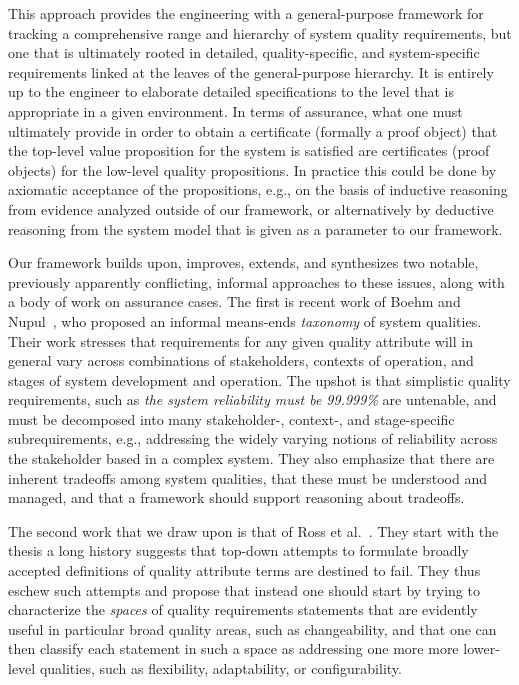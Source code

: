\documentclass[conference]{IEEEtran}
\begin{document}
This approach provides the engineering with a general-purpose framework for tracking a comprehensive range and hierarchy of system quality requirements, but one that is ultimately rooted in detailed, quality-specific, and system-specific requirements linked at the leaves of the general-purpose hierarchy. It is entirely up to the engineer to elaborate detailed specifications to the level that is appropriate in a given environment. In terms of assurance, what one must ultimately provide in order to obtain a certificate (formally a proof object) that the top-level value proposition for the system is satisfied are certificates (proof objects) for the low-level quality propositions. In practice this could be done by axiomatic acceptance of the propositions, e.g., on the basis of inductive reasoning from evidence analyzed outside of our framework, or alternatively by deductive reasoning from the system model that is given as a parameter to our framework.  

Our framework builds upon, improves, extends, and synthesizes two notable, previously apparently conflicting, informal approaches to these issues, along with a body of work on assurance cases. The first is recent work of Boehm and Nupul~\cite{}, who proposed an informal means-ends {\em taxonomy} of system qualities. Their work stresses that requirements for any given quality attribute will in general vary across combinations of stakeholders, contexts of operation, and stages of system development and operation. The upshot is that simplistic quality requirements, such as {\em the system reliability must be 99.999\%} are untenable, and must be decomposed into many stakeholder-, context-, and stage-specific subrequirements, e.g., addressing the widely varying notions of reliability across the stakeholder based in a complex system. They also emphasize that there are inherent tradeoffs among system qualities, that these must be understood and managed, and that a framework should support reasoning about tradeoffs. 

The second work that we draw upon is that of Ross et al.~\cite{ross-15}. They start with the thesis a long history suggests that top-down attempts to formulate broadly accepted definitions of quality attribute terms are destined to fail. They thus eschew such attempts and propose that instead one should start by trying to characterize the {\em spaces} of quality requirements statements that are evidently useful in particular broad quality areas, such as changeability, and that one can then classify each statement in such a space as addressing one more more lower-level qualities, such as flexibility, adaptability, or configurability.
\end{document}
